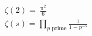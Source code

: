 \newenvironment{mysubeqn}%
  {\begin{subequations}
    \renewcommand\theequation{\theparentequation-\roman{equation}}}%
  {\end{subequations}}
\begin{mysubeqn}
\begin{gather}
  \zeta(2) = \frac{\uppi^2}{6} \\
  \zeta(s) = \prod_{p\text{ prime}} \frac{1}{1 - p^{-s}}
\end{gather}
\end{mysubeqn}
